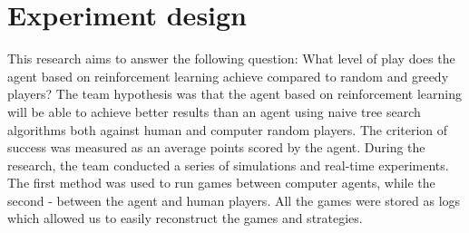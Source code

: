 \section{Experiment design}
This research aims to answer the following question:
What level of play does the agent based on reinforcement learning achieve compared to random and greedy players?
The team hypothesis was that the agent based on reinforcement learning will be 
able to achieve better results than an agent using naive tree search algorithms 
both against human and computer random players. The criterion of success was 
measured as an average points scored by the agent.
During the research, the team conducted a series of simulations and real-time experiments. 
The first method was used to run games between computer agents, while the second 
- between the agent and human players.  All the games were stored as logs 
which allowed us to easily reconstruct the games and strategies.
